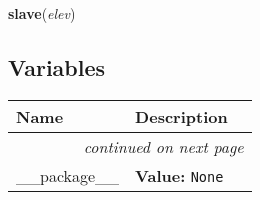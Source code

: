     \vspace{0.5ex}

\hspace{.8\funcindent}\begin{boxedminipage}{\funcwidth}

    \raggedright \textbf{slave}(\textit{elev})

\setlength{\parskip}{2ex}
\setlength{\parskip}{1ex}
    \end{boxedminipage}



  \subsection{Variables}

    \vspace{-1cm}
\hspace{\varindent}\begin{longtable}{|p{\varnamewidth}|p{\vardescrwidth}|l}
\cline{1-2}
\cline{1-2} \centering \textbf{Name} & \centering \textbf{Description}& \\
\cline{1-2}
\endhead\cline{1-2}\multicolumn{3}{r}{\small\textit{continued on next page}}\\\endfoot\cline{1-2}
\endlastfoot\raggedright \_\-\_\-p\-a\-c\-k\-a\-g\-e\-\_\-\_\- & \raggedright \textbf{Value:} 
{\tt None}&\\
\cline{1-2}
\end{longtable}

